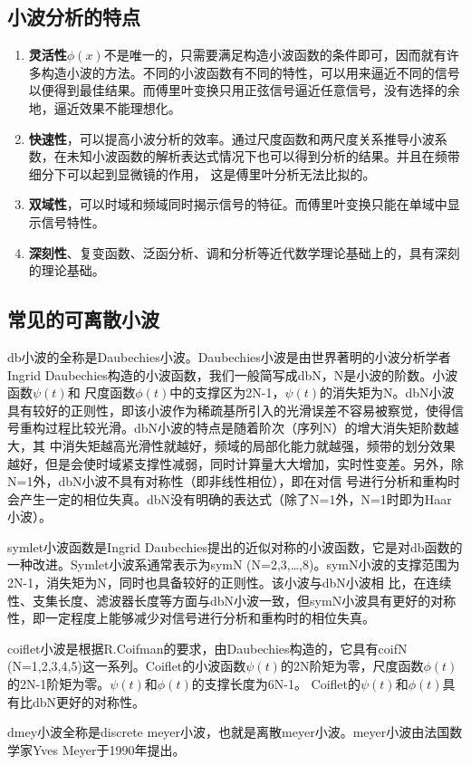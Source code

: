 \subsection{小波分析的特点}
\begin{enumerate}[1)]
	\item\textbf{灵活性}$\phi(x)$不是唯一的，只需要满足构造小波函数的条件即可，因而就有许多构造小波的方法。不同的小波函数有不同的特性，可以用来逼近不同的信号
以便得到最佳结果。而傅里叶变换只用正弦信号逼近任意信号，没有选择的余地，逼近效果不能理想化。
	\item\textbf{快速性}，可以提高小波分析的效率。通过尺度函数和两尺度关系推导小波系数，在未知小波函数的解析表达式情况下也可以得到分析的结果。并且在频带细分下可以起到显微镜的作用，
这是傅里叶分析无法比拟的。
	\item\textbf{双域性}，可以时域和频域同时揭示信号的特征。而傅里叶变换只能在单域中显示信号特性。
	\item\textbf{深刻性}、复变函数、泛函分析、调和分析等近代数学理论基础上的，具有深刻的理论基础。
\end{enumerate}
\subsection{常见的可离散小波}
\par db小波的全称是Daubechies小波。Daubechies小波是由世界著明的小波分析学者Ingrid Daubechies构造的小波函数，我们一般简写成dbN，N是小波的阶数。小波函数$\psi(t)$和
尺度函数$\phi(t)$中的支撑区为2N-1，$\psi(t)$的消失矩为N。dbN小波具有较好的正则性，即该小波作为稀疏基所引入的光滑误差不容易被察觉，使得信号重构过程比较光滑。dbN小波的特点是随着阶次（序列N）的增大消失矩阶数越大，其
中消失矩越高光滑性就越好，频域的局部化能力就越强，频带的划分效果越好，但是会使时域紧支撑性减弱，同时计算量大大增加，实时性变差。另外，除N=1外，dbN小波不具有对称性（即非线性相位），即在对信
号进行分析和重构时会产生一定的相位失真。dbN没有明确的表达式（除了N=1外，N=1时即为Haar小波）。
\par symlet小波函数是Ingrid Daubechies提出的近似对称的小波函数，它是对db函数的一种改进。Symlet小波系通常表示为symN (N=2,3,…,8)。symN小波的支撑范围为2N-1，消失矩为N，同时也具备较好的正则性。该小波与dbN小波相
比，在连续性、支集长度、滤波器长度等方面与dbN小波一致，但symN小波具有更好的对称性，即一定程度上能够减少对信号进行分析和重构时的相位失真。
\par coiflet小波是根据R.Coifman的要求，由Daubechies构造的，它具有coifN (N=1,2,3,4,5)这一系列。Coiflet的小波函数$\psi(t)$的2N阶矩为零，尺度函数$\phi(t)$的2N-1阶矩为零。$\psi(t)$和$\phi(t)$的支撑长度为6N-1。
Coiflet的$\psi(t)$和$\phi(t)$具有比dbN更好的对称性。
\par dmey小波全称是discrete meyer小波，也就是离散meyer小波。meyer小波由法国数学家Yves Meyer于1990年提出。
